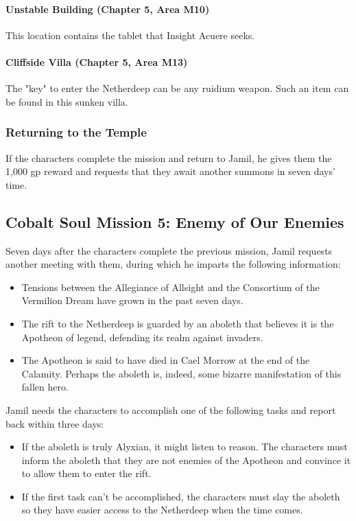 \documentclass[10pt,a4paper,twoside,twocolumn,openany,nodeprecatedcode]{dndbook}
\begin{document}
\paragraph{Unstable Building (Chapter 5, Area M10)}
This location contains the tablet that Insight Acuere seeks.

\paragraph{Cliffside Villa (Chapter 5, Area M13)}
The "key" to enter the Netherdeep can be any ruidium weapon. Such an item can be found in this sunken villa.

\subsubsection{Returning to the Temple}
If the characters complete the mission and return to Jamil, he gives them the 1,000 gp reward and requests that they await another summons in seven days' time.

\subsection{Cobalt Soul Mission 5: Enemy of Our Enemies}
Seven days after the characters complete the previous mission, Jamil requests another meeting with them, during which he imparts the following information:


\begin{itemize}
\item Tensions between the Allegiance of Allsight and the Consortium of the Vermilion Dream have grown in the past seven days.
\item The rift to the Netherdeep is guarded by an aboleth that believes it is the Apotheon of legend, defending its realm against invaders.
\item The Apotheon is said to have died in Cael Morrow at the end of the Calamity. Perhaps the aboleth is, indeed, some bizarre manifestation of this fallen hero.
\end{itemize}

Jamil needs the characters to accomplish one of the following tasks and report back within three days:


\begin{itemize}
\item If the aboleth is truly Alyxian, it might listen to reason. The characters must inform the aboleth that they are not enemies of the Apotheon and convince it to allow them to enter the rift.
\item If the first task can't be accomplished, the characters must slay the aboleth so they have easier access to the Netherdeep when the time comes.
\end{itemize}
\end{document}
